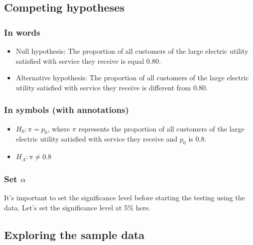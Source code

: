 \documentclass[12pt,]{krantz}
\makeatletter
\newenvironment{Shaded}{\begin{snugshade}}{\end{snugshade}}
\newcommand{\KeywordTok}[1]{\textcolor[rgb]{0.27,0.27,0.27}{\textbf{#1}}}
\newcommand{\DataTypeTok}[1]{\textcolor[rgb]{0.27,0.27,0.27}{#1}}
\newcommand{\DecValTok}[1]{\textcolor[rgb]{0.06,0.06,0.06}{#1}}
\newcommand{\StringTok}[1]{\textcolor[rgb]{0.5,0.5,0.5}{#1}}
\newcommand{\OperatorTok}[1]{\textcolor[rgb]{0.43,0.43,0.43}{\textbf{#1}}}
\newcommand{\NormalTok}[1]{#1}
\providecommand{\tightlist}{%
  \setlength{\itemsep}{0pt}\setlength{\parskip}{0pt}}
\newenvironment{kframe}{%
\medskip{}
\setlength{\fboxsep}{.8em}
 \def\at@end@of@kframe{}%
 \ifinner\ifhmode%
  \def\at@end@of@kframe{\end{minipage}}%
  \begin{minipage}{\columnwidth}%
 \fi\fi%
 \def\FrameCommand##1{\hskip\@totalleftmargin \hskip-\fboxsep
 \colorbox{shadecolor}{##1}\hskip-\fboxsep
     \hskip-\linewidth \hskip-\@totalleftmargin \hskip\columnwidth}%
 \MakeFramed {\advance\hsize-\width
   \@totalleftmargin\z@ \linewidth\hsize
   \@setminipage}}%
 {\par\unskip\endMakeFramed%
 \at@end@of@kframe}
\renewenvironment{Shaded}{\begin{kframe}}{\end{kframe}}
\makeatother
\begin{document}
\subsection{Competing hypotheses}\label{competing-hypotheses-1}

\subsubsection*{In words}\label{in-words-1}


\begin{itemize}
\item
  Null hypothesis: The proportion of all customers of the large electric
  utility satisfied with service they receive is equal 0.80.
\item
  Alternative hypothesis: The proportion of all customers of the large
  electric utility satisfied with service they receive is different from
  0.80.
\end{itemize}

\subsubsection*{In symbols (with
annotations)}\label{in-symbols-with-annotations-1}


\begin{itemize}
\tightlist
\item
  \(H_0: \pi = p_{0}\), where \(\pi\) represents the proportion of all
  customers of the large electric utility satisfied with service they
  receive and \(p_0\) is 0.8.
\item
  \(H_A: \pi \ne 0.8\)
\end{itemize}

\subsubsection*{\texorpdfstring{Set
\(\alpha\)}{Set \textbackslash{}alpha}}\label{set-alpha-1}


It's important to set the significance level before starting the testing
using the data. Let's set the significance level at 5\% here.

\subsection{Exploring the sample
data}\label{exploring-the-sample-data-1}

\begin{Shaded}
\end{Shaded}
\end{document}

